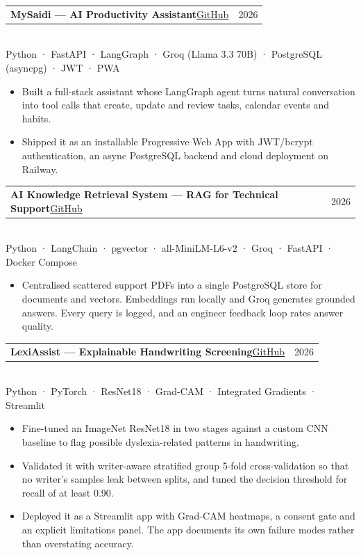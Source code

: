 \documentclass[10pt,a4paper]{article}
\makeatletter
\newcommand{\meta}[1]{{\color{muted}#1}}
\newcommand{\project}[5]{%
  \begin{tabularx}{\linewidth}{@{}X r@{}}
    {\fontsize{10.5}{12.5}\selectfont\bfseries #1}\hspace{0.5em}\href{#3}{\color{accent}\small #2} & \meta{#4} \\
  \end{tabularx}\\[-1pt]
  {\color{muted}\small #5}\par
}
\makeatother
\begin{document}
\vspace{3pt}
\project{MySaidi — AI Productivity Assistant}{GitHub}{https://github.com/Calvin-Gacheru/MySaidi}{2026}
  {Python · FastAPI · LangGraph · Groq (Llama 3.3 70B) · PostgreSQL (asyncpg) · JWT · PWA}
\begin{itemize}
  \item Built a full-stack assistant whose LangGraph agent turns natural conversation into tool calls that create, update and review tasks, calendar events and habits.
  \item Shipped it as an installable Progressive Web App with JWT/bcrypt authentication, an async PostgreSQL backend and cloud deployment on Railway.
\end{itemize}

\vspace{3pt}
\project{AI Knowledge Retrieval System — RAG for Technical Support}{GitHub}{https://github.com/Calvin-Gacheru/AI-KNOWLEDGE-RETRIEVAL-SYSTEM}{2026}
  {Python · LangChain · pgvector · all-MiniLM-L6-v2 · Groq · FastAPI · Docker Compose}
\begin{itemize}
  \item Centralised scattered support PDFs into a single PostgreSQL store for documents and vectors. Embeddings run locally and Groq generates grounded answers. Every query is logged, and an engineer feedback loop rates answer quality.
\end{itemize}

\vspace{3pt}
\project{LexiAssist — Explainable Handwriting Screening}{GitHub}{https://github.com/Calvin-Gacheru/LexiAssist}{2026}
  {Python · PyTorch · ResNet18 · Grad-CAM · Integrated Gradients · Streamlit}
\begin{itemize}
  \item Fine-tuned an ImageNet ResNet18 in two stages against a custom CNN baseline to flag possible dyslexia-related patterns in handwriting.
  \item Validated it with writer-aware stratified group 5-fold cross-validation so that no writer's samples leak between splits, and tuned the decision threshold for recall of at least 0.90.
  \item Deployed it as a Streamlit app with Grad-CAM heatmaps, a consent gate and an explicit limitations panel. The app documents its own failure modes rather than overstating accuracy.
\end{itemize}
\end{document}
